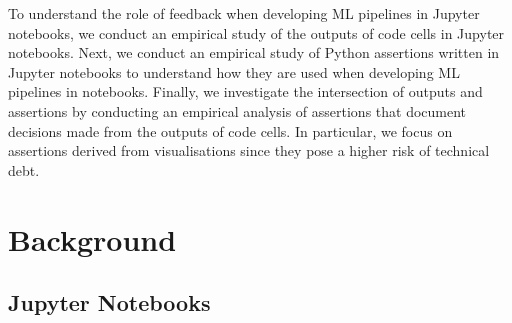 To understand the role of feedback when developing ML pipelines in Jupyter notebooks, we conduct an empirical study of the outputs of code cells in Jupyter notebooks. Next, we conduct an empirical study of Python assertions written in Jupyter notebooks to understand how they are used when developing ML pipelines in notebooks. Finally, we investigate the intersection of outputs and assertions by conducting an empirical analysis of assertions that document decisions made from the outputs of code cells. In particular, we focus on assertions derived from visualisations since they pose a higher risk of technical debt.





\section{Background}\label{sec:background}

\subsection{Jupyter Notebooks}

